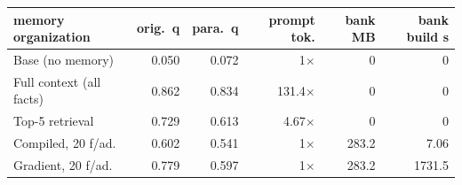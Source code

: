 \setlength{\tabcolsep}{4.5pt}
\begin{tabular}{lrrrrr}
\toprule
memory organization & orig.\ q & para.\ q & prompt tok. & bank MB & bank build s \\
\midrule
Base (no memory) & 0.050 & 0.072 & 1$\times$ & 0 & 0 \\
Full context (all \NPerArm{} facts) & 0.862 & 0.834 & 131.4$\times$ & 0 & 0 \\
Top-5 retrieval & 0.729 & 0.613 & 4.67$\times$ & 0 & 0 \\
Compiled, 20 f/ad. & 0.602 & 0.541 & 1$\times$ & 283.2 & 7.06 \\
Gradient, 20 f/ad. & 0.779 & 0.597 & 1$\times$ & 283.2 & 1731.5 \\
\bottomrule
\end{tabular}
